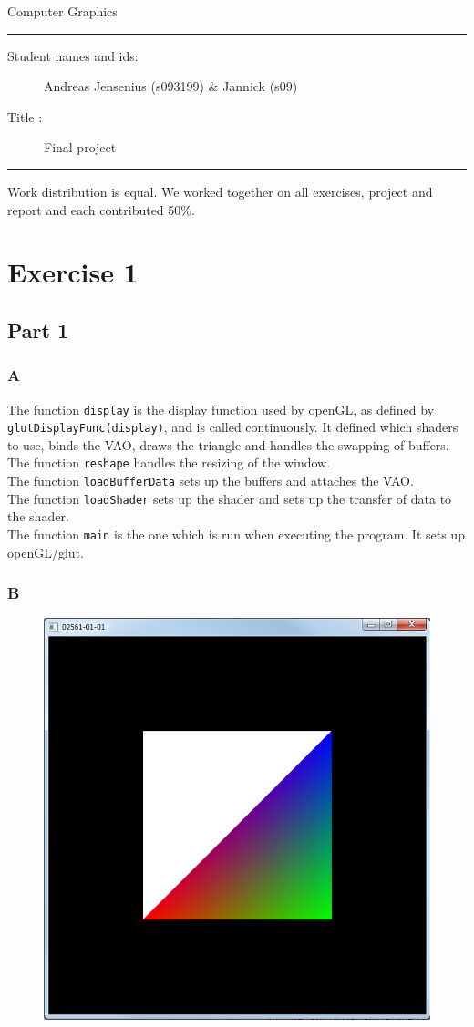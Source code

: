 \documentclass[11pt]{article}
\begin{document}
\begin{center}
{{\Large \sc Computer Graphics}}
\end{center}
\rule{\textwidth}{1pt}
\begin{description}
\item[Student names and ids:] Andreas Jensenius (s093199) \& Jannick (s09) 
\item[Title :] Final project
\end{description}
\rule{\textwidth}{1pt}

Work distribution is equal. We worked together on all exercises, project and report and each contributed 50\%. 

\section{Exercise 1}
\subsection{Part 1}
\subsubsection{A}
The function \texttt{display} is the display function used by openGL, as defined by \texttt{glutDisplayFunc(display)}, and is called continuously. It defined which shaders to use, binds the VAO, draws the triangle and handles the swapping of buffers.\\

\noindent The function \texttt{reshape} handles the resizing of the window.\\

\noindent The function \texttt{loadBufferData} sets up the buffers and attaches the VAO.\\

\noindent The function \texttt{loadShader} sets up the shader and sets up the transfer of data to the shader.\\

\noindent The function \texttt{main} is the one which is run when executing the program. It sets up openGL/glut.

\subsubsection{B}
\begin{figure}[H]
\centering
\includegraphics[width=0.5\linewidth]{images/e01p1b}
\label{fig:e01p1b}
\end{figure}
\end{document}

